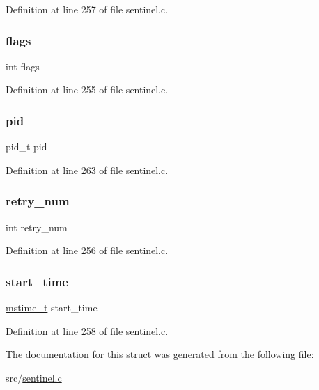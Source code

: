 Definition at line 257 of file sentinel.\+c.

\mbox{\label{structsentinel_script_job_ac8bf36fe0577cba66bccda3a6f7e80a4}} 
\subsubsection{\texorpdfstring{flags}{flags}}
{\footnotesize\ttfamily int flags}



Definition at line 255 of file sentinel.\+c.

\mbox{\label{structsentinel_script_job_ae0d46a978d5cd6707411f276ad869b9c}} 
\subsubsection{\texorpdfstring{pid}{pid}}
{\footnotesize\ttfamily pid\+\_\+t pid}



Definition at line 263 of file sentinel.\+c.

\mbox{\label{structsentinel_script_job_ac3a9095a99d069bdd19aa9a53117ba04}} 
\subsubsection{\texorpdfstring{retry\+\_\+num}{retry\_num}}
{\footnotesize\ttfamily int retry\+\_\+num}



Definition at line 256 of file sentinel.\+c.

\mbox{\label{structsentinel_script_job_a1a4deca16d7aa189e7005dda267c5f40}} 
\subsubsection{\texorpdfstring{start\+\_\+time}{start\_time}}
{\footnotesize\ttfamily \hyperlink{redismodule_8h_a652ae61e2475bc8957454534544968fc}{mstime\+\_\+t} start\+\_\+time}



Definition at line 258 of file sentinel.\+c.



The documentation for this struct was generated from the following file\+:\begin{DoxyCompactItemize}
\item 
src/\hyperlink{sentinel_8c}{sentinel.\+c}\end{DoxyCompactItemize}
